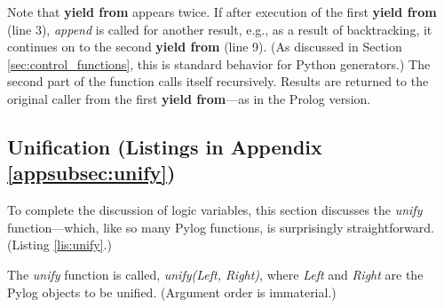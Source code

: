 



Note that \textbf{yield from} appears twice. If after execution of the first \textbf{yield from} (line 3), \textit{append} is called for another result, e.g., as a result of backtracking, it continues on to the second \textbf{yield from} (line 9). (As discussed in Section \ref{sec:control_functions}, this is standard behavior for Python generators.) The second part of the function calls itself recursively. Results are returned to the original caller from the first \textbf{yield from}---as in the Prolog version. 

\subsection{Unification (Listings in Appendix \ref{appsubsec:unify})} \label{subsec:unify}

To complete the discussion of logic variables, this section discusses the \textit{unify} function---which, like so many Pylog functions, is surprisingly straightforward. (Listing \ref{lis:unify}.)

The \textit{unify} function is called, \textit{unify(Left, Right)}, where \textit{Left} and \textit{Right} are the Pylog objects to be unified. (Argument order is immaterial.) 


